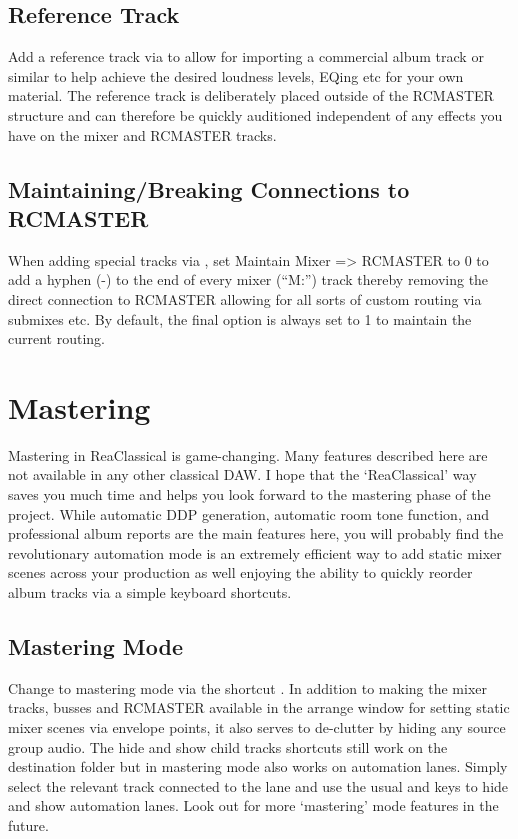 \documentclass[10pt,american]{article}
\begin{document}
\subsection{Reference Track}

Add a reference track via \keys{\#} to allow for importing a commercial album
track or similar to help achieve the desired loudness levels, EQing etc for your
own material. The reference track is deliberately placed outside of the RCMASTER
structure and can therefore be quickly auditioned independent of any effects you
have on the mixer and RCMASTER tracks.

\subsection{Maintaining/Breaking Connections to RCMASTER}

When adding special tracks via \keys{\#}, set \textquotedbl Maintain Mixer =>
RCMASTER\textquotedbl{} to 0 to add a hyphen (-) to the end of every mixer
(``M:'') track thereby removing the direct connection to RCMASTER allowing for
all sorts of custom routing via submixes etc. By default, the final option is
always set to 1 to maintain the current routing.

\section{Mastering}

Mastering in ReaClassical is game-changing. Many features described here are not
available in any other classical DAW. I hope that the `ReaClassical' way saves
you much time and helps you look forward to the mastering phase of the project.
While automatic DDP generation, automatic room tone function, and professional
album reports are the main features here, you will probably find the
revolutionary automation mode is an extremely efficient way to add static mixer
scenes across your production as well enjoying the ability to quickly reorder
album tracks via a simple keyboard shortcuts.

\subsection{Mastering Mode}

Change to mastering mode via the shortcut . In addition to making
the mixer tracks, busses and RCMASTER available in the arrange window for
setting static mixer scenes via envelope points, it also serves to de-clutter by
hiding any source group audio. The hide and show child tracks shortcuts still
work on the destination folder but in mastering mode also works on automation
lanes. Simply select the relevant track connected to the lane and use the usual
 and  keys to hide and show automation lanes. Look out for more
`mastering' mode features in the future.
\end{document}
